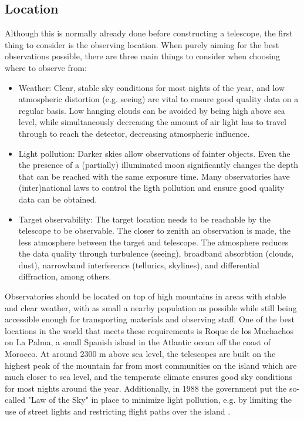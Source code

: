 \documentclass[a4paper,oneside,12pt, class=Latex/Classes/PhDthesisPSnPDF, crop=false]{standalone}
\begin{document}
\subsection{Location}
Although this is normally already done before constructing a telescope, the first thing to consider is the observing location. When purely aiming for the best observations possible, there are three main things to consider when choosing where to observe from:
\begin{itemize}
    \item {Weather: Clear, stable sky conditions for most nights of the year, and low atmospheric distortion (e.g. seeing) are vital to ensure good quality data on a regular basis. Low hanging clouds can be avoided by being high above sea level, while simultaneously decreasing the amount of air light has to travel through to reach the detector, decreasing atmospheric influence.}
    \item {Light pollution: Darker skies allow observations of fainter objects. Even the the presence of a (partially) illuminated moon significantly changes the depth that can be reached with the same exposure time. Many observatories have (inter)national laws to control the ligth pollution and ensure good quality data can be obtained.}
    \item {Target observability: The target location needs to be reachable by the telescope to be observable. The closer to zenith an observation is made, the less atmosphere between the target and telescope. The atmosphere reduces the data quality through turbulence (seeing), broadband absorbtion (clouds, dust), narrowband interference (tellurics, skylines), and differential diffraction, among others.}
\end{itemize}

Observatories should be located on top of high mountains in areas with stable and clear weather, with as small a nearby population as possible while still being accessible enough for transporting materials and observing staff. One of the best locations in the world that meets these requirements is Roque de los Muchachos on La Palma, a small Spanish island in the Atlantic ocean off the coast of Morocco. At around 2300 m above sea level, the telescopes are built on the highest peak of the mountain far from most communities on the island which are much closer to sea level, and the temperate climate ensures good sky conditions for most nights around the year. Additionally, in 1988 the government put the so-called "Law of the Sky" in place to minimize light pollution, e.g. by limiting the use of street lights and restricting flight paths over the island \citep{LP_Sky_law}.
\end{document}
